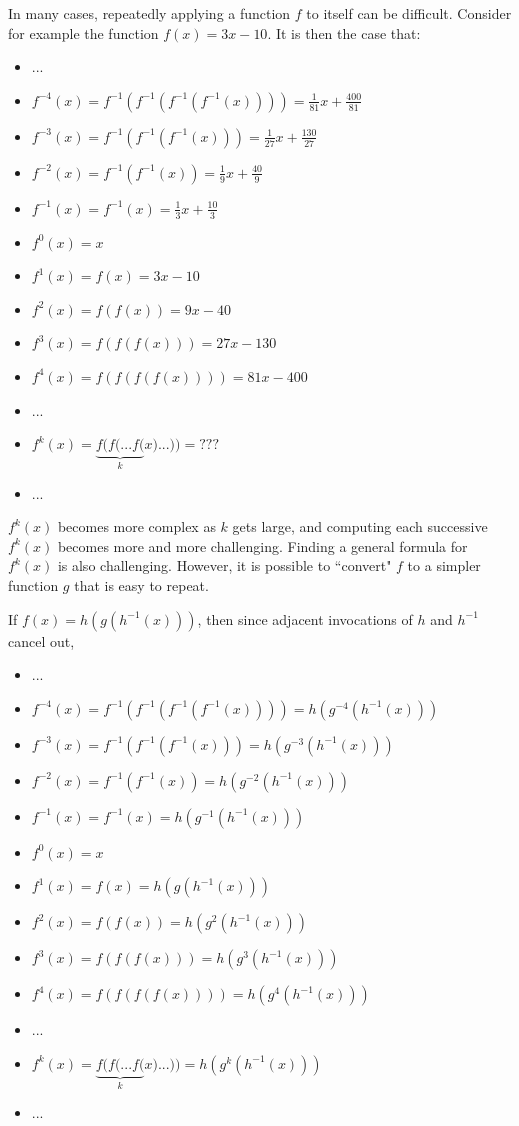 \documentclass{article}
\begin{document}
\vspace{5mm}

In many cases, repeatedly applying a function \(f\) to itself can be difficult. Consider for example the function \(f(x) = 3x - 10\). It is then the case that:  

\begin{itemize}
\item ...
\item \(f^{-4}(x) = f^{-1}(f^{-1}(f^{-1}(f^{-1}(x)))) = \frac{1}{81}x + \frac{400}{81}\)
\item \(f^{-3}(x) = f^{-1}(f^{-1}(f^{-1}(x))) = \frac{1}{27}x + \frac{130}{27}\)
\item \(f^{-2}(x) = f^{-1}(f^{-1}(x)) = \frac{1}{9}x + \frac{40}{9}\)
\item \(f^{-1}(x) = f^{-1}(x) = \frac{1}{3}x + \frac{10}{3}\)
\item \(f^0(x) = x\)
\item \(f^1(x) = f(x) = 3x - 10\)
\item \(f^2(x) = f(f(x)) = 9x - 40\) %
\item \(f^3(x) = f(f(f(x))) = 27x - 130\) %
\item \(f^4(x) = f(f(f(f(x)))) = 81x - 400\) %
\item ...
\item \(f^k(x) = \underbrace{f(f(...f(}_k x)...)) = ???\)
\item ...
\end{itemize}

\(f^k(x)\) becomes more complex as \(k\) gets large, and computing each successive \(f^k(x)\) becomes more and more challenging. Finding a general formula for \(f^k(x)\) is also challenging. However, it is possible to ``convert" \(f\) to a simpler function \(g\) that is easy to repeat. 

\vspace{5mm}

If \(f(x) = h(g(h^{-1}(x)))\), then since adjacent invocations of \(h\) and \(h^{-1}\) cancel out, 
\begin{itemize}
\item ... 
\item \(f^{-4}(x) = f^{-1}(f^{-1}(f^{-1}(f^{-1}(x)))) = h(g^{-4}(h^{-1}(x)))\)
\item \(f^{-3}(x) = f^{-1}(f^{-1}(f^{-1}(x))) = h(g^{-3}(h^{-1}(x)))\)
\item \(f^{-2}(x) = f^{-1}(f^{-1}(x)) = h(g^{-2}(h^{-1}(x)))\)
\item \(f^{-1}(x) = f^{-1}(x) = h(g^{-1}(h^{-1}(x)))\)
\item \(f^0(x) = x\)
\item \(f^1(x) = f(x) = h(g(h^{-1}(x)))\)
\item \(f^2(x) = f(f(x)) = h(g^2(h^{-1}(x)))\)
\item \(f^3(x) = f(f(f(x))) = h(g^3(h^{-1}(x)))\)
\item \(f^4(x) = f(f(f(f(x)))) = h(g^4(h^{-1}(x)))\)
\item ...
\item \(f^k(x) = \underbrace{f(f(...f(}_k x)...)) = h(g^k(h^{-1}(x)))\)
\item ...
\end{itemize}
\end{document}
